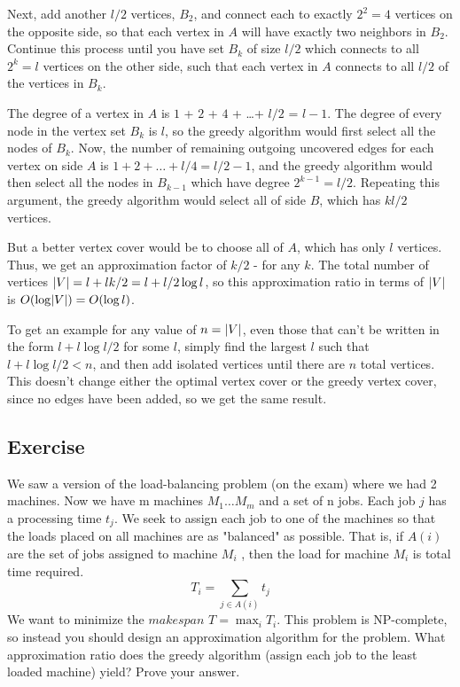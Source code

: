 \documentclass{article}
\newcounter{counter}
\newcommand{\Exercise}{Exercise \stepcounter{counter}\thecounter}
\DeclarePairedDelimiter\abs{\lvert}{\rvert}%
\begin{document}
    \vspace{3mm}
    Next, add another $l/2$ vertices, $B_2$, and connect each to exactly $2^2 = 4$ vertices on the opposite side, so that each vertex in $A$ will have exactly two neighbors in $B_2$. Continue this process until you have set $B_k$ of size $l/2$ which connects to all $2^k = l$ vertices on the other side, such that each vertex in $A$ connects to all $l/2$ of the vertices in $B_k$. %

    \vspace{3mm}
    The degree of a vertex in $A$ is $1$ + $2$ + $4$ + \ldots + $l/2$ = $l-1$. The degree of every node in the vertex set $B_k$ is $l$, so the greedy algorithm would first select all the nodes of $B_k$. Now, the number of remaining outgoing uncovered edges for each vertex on side $A$ is $1 + 2 + \ldots + l/4 = l/2 -1 $, and the greedy algorithm would then select all the nodes in $B_{k-1}$ which have degree $2^{k-1} = l/2$. Repeating this argument, the greedy algorithm would select all of side $B$, which has $kl/2$ vertices.

    \vspace{3mm}
    But a better vertex cover would be to choose all of $A$, which has only $l$ vertices. Thus, we get an approximation factor of $k/2$ - for any $k$. The total number of vertices $\abs{V} = l + lk/2 = l + l/2\log l$, so this approximation ratio in terms of $\abs{V}$ is $O(\log \abs{V}) = O(\log l)$.

    \vspace{3mm}
    To get an example for any value of $n = \abs{V}$, even those that can't be written in the form $l + l\log l /2$ for some $l$, simply find the largest $l$ such that $l + l\log l/2 < n$, and then add isolated vertices until there are $n$ total vertices. This doesn't change either the optimal vertex cover or the greedy vertex cover, since no edges have been added, so we get the same result.

\subsection*{\Exercise}
    We saw a version of the load-balancing problem (on the exam) where we had 2 machines.  Now we have m machines $M_1 \ldots M_m$ and a set of n jobs. Each job $j$ has a processing time $t_j$. We seek to assign each job to one of the machines so that the loads placed on all machines are as "balanced" as possible. That is, if $A(i)$ are the set of jobs assigned to machine $M_i$ , then the load for machine $M_i$ is total time required.  \[ T_i = \sum_{j \in A(i)} t_j\] We want to minimize the $makespan$ $T = \max_i T_i$.  This problem is NP-complete, so instead you should design an approximation algorithm for the problem. What approximation ratio does the greedy algorithm (assign each job to the least loaded machine) yield? Prove your answer.
\end{document}
